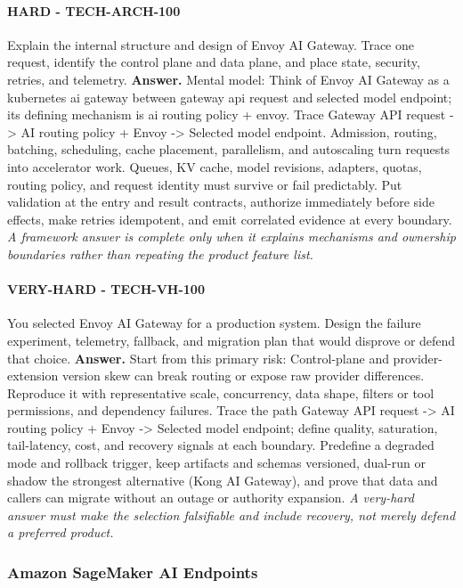 \paragraph{HARD - TECH-ARCH-100} Explain the internal structure and design of Envoy AI Gateway. Trace one request, identify the control plane and data plane, and place state, security, retries, and telemetry.
\textbf{Answer.} Mental model: Think of Envoy AI Gateway as a kubernetes ai gateway between gateway api request and selected model endpoint; its defining mechanism is ai routing policy + envoy. Trace Gateway API request -> AI routing policy + Envoy -> Selected model endpoint. Admission, routing, batching, scheduling, cache placement, parallelism, and autoscaling turn requests into accelerator work. Queues, KV cache, model revisions, adapters, quotas, routing policy, and request identity must survive or fail predictably. Put validation at the entry and result contracts, authorize immediately before side effects, make retries idempotent, and emit correlated evidence at every boundary.
\textit{A framework answer is complete only when it explains mechanisms and ownership boundaries rather than repeating the product feature list.}
\paragraph{VERY-HARD - TECH-VH-100} You selected Envoy AI Gateway for a production system. Design the failure experiment, telemetry, fallback, and migration plan that would disprove or defend that choice.
\textbf{Answer.} Start from this primary risk: Control-plane and provider-extension version skew can break routing or expose raw provider differences. Reproduce it with representative scale, concurrency, data shape, filters or tool permissions, and dependency failures. Trace the path Gateway API request -> AI routing policy + Envoy -> Selected model endpoint; define quality, saturation, tail-latency, cost, and recovery signals at each boundary. Predefine a degraded mode and rollback trigger, keep artifacts and schemas versioned, dual-run or shadow the strongest alternative (Kong AI Gateway), and prove that data and callers can migrate without an outage or authority expansion.
\textit{A very-hard answer must make the selection falsifiable and include recovery, not merely defend a preferred product.}
\subsubsection*{Amazon SageMaker AI Endpoints}
